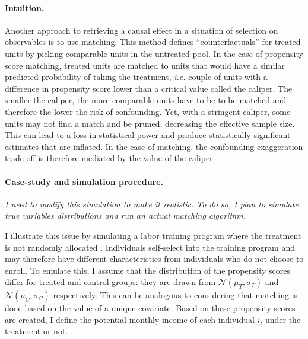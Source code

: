 \documentclass[usletter, 12pt]{article}
\begin{document}
			\paragraph{Intuition.} Another approach to retrieving a causal effect in a situation of selection on observables is to use matching. This method defines ``counterfactuals'' for treated units by picking comparable units in the untreated pool. 
			In the case of propensity score matching, treated units are matched to units that would have a similar predicted probability of taking the treatment, \textit{i.e.} couple of units with a difference in propensity score lower than a critical value called the caliper. The smaller the caliper, the more comparable units have to be to be matched and therefore the lower the risk of confounding. Yet, with a stringent caliper, some units may not find a match and be pruned, decreasing the effective sample size. This can lead to a loss in statistical power and produce statistically significant estimates that are inflated. In the case of matching, the confounding-exaggeration trade-off is therefore mediated by the value of the caliper.
                
       	 	\paragraph{Case-study and simulation procedure.} \textit{I need to modify this simulation to make it realistic. To do so, I plan to simulate true variables distributions and run an actual matching algorithm.}
		
		 I illustrate this issue by simulating a labor training program where the treatment is not randomly allocated \citep{dehejia_causal_1999}. Individuals self-select into the training program and may therefore have different characteristics from individuals who do not choose to enroll. To emulate this, I assume that the distribution of the propensity scores differ for treated and control groups: they are drawn from $\mathcal{N}(\mu_T,\sigma_T)$ and $\mathcal{N}(\mu_C, \sigma_C)$ respectively. This can be analogous to considering that matching is done based on the value of a unique covariate. Based on these propensity scores are created, I define the potential monthly income of each individual $i$, under the treatment or not.%
        
\end{document}
